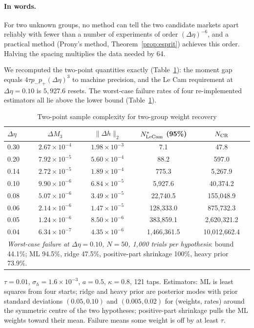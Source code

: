\documentclass[12pt]{article}
\theoremstyle{definition}
\theoremstyle{remark}
\begin{document}
\paragraph{In words.} For two unknown groups, no method can tell the two candidate markets apart reliably with fewer than a number of experiments of order $(\Delta\eta)^{-6}$, and a practical method (Prony's method, Theorem~\ref{prop:esprit}) achieves this order. Halving the spacing multiplies the data needed by 64.

We recomputed the two-point quantities exactly (Table~\ref{tab:lecam}): the moment gap equals $4\tau p_-p_+(\Delta\eta)^3$ to machine precision, and the Le Cam requirement at $\Delta\eta=0.10$ is $5{,}927.6$ resets. The worst-case failure rates of four re-implemented estimators all lie above the lower bound (Table~\ref{tab:lecam}).

\begin{table}[t]\centering\small
\begin{threeparttable}
\caption{Two-point sample complexity for two-group weight recovery}\label{tab:lecam}
\begin{tabular}{lcccc}
\toprule
$\Delta\eta$ & $\Delta M_3$ & $\|\Delta h\|_2$ & $N^*_{\rm LeCam}$ (95\%) & $N_{\rm CR}$\\
\midrule
0.30 & $2.67\times10^{-4}$ & $1.98\times10^{-3}$ & 7.1 & 47.8\\
0.20 & $7.92\times10^{-5}$ & $5.60\times10^{-4}$ & 88.2 & 597.0\\
0.14 & $2.72\times10^{-5}$ & $1.89\times10^{-4}$ & 775.3 & 5{,}267.9\\
0.10 & $9.90\times10^{-6}$ & $6.84\times10^{-5}$ & 5{,}927.6 & 40{,}374.2\\
0.08 & $5.07\times10^{-6}$ & $3.49\times10^{-5}$ & 22{,}740.5 & 155{,}048.9\\
0.06 & $2.14\times10^{-6}$ & $1.47\times10^{-5}$ & 128{,}333.0 & 875{,}732.3\\
0.05 & $1.24\times10^{-6}$ & $8.50\times10^{-6}$ & 383{,}859.1 & 2{,}620{,}321.2\\
0.04 & $6.34\times10^{-7}$ & $4.35\times10^{-6}$ & 1{,}466{,}361.5 & 10{,}012{,}662.4\\
\midrule
\multicolumn{5}{p{0.85\textwidth}}{\emph{Worst-case failure at $\Delta\eta=0.10$, $N=50$, 1,000 trials per hypothesis}: bound 44.1\%; ML 94.5\%, ridge 47.5\%, positive-part shrinkage 100\%, heavy prior 73.9\%.}\\
\bottomrule
\end{tabular}
\begin{tablenotes}\footnotesize\item $\tau=0.01$, $\sigma_h=1.6\times10^{-3}$, $a=0.5$, $\kappa=0.8$, 121 taps. Estimators: ML is least squares from four starts; ridge and heavy prior are posterior modes with prior standard deviations $(0.05,0.10)$ and $(0.005,0.02)$ for (weights, rates) around the symmetric centre of the two hypotheses; positive-part shrinkage pulls the ML weights toward their mean. Failure means some weight is off by at least $\tau$.\end{tablenotes}
\end{threeparttable}
\end{table}
\end{document}
